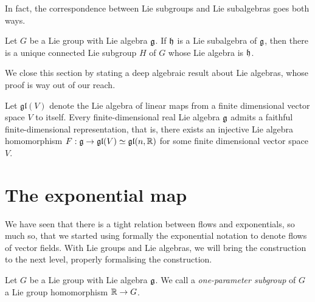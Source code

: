 In fact, the correspondence between Lie subgroups and Lie subalgebras goes both ways.

\begin{theorem}
	Let $G$ be a Lie group with Lie algebra $\mathfrak{g}$. If $\mathfrak{h}$ is a Lie subalgebra of $\mathfrak{g}$, then there is a unique connected Lie subgroup $H$ of $G$ whose Lie algebra is $\mathfrak{h}$.
\end{theorem}

We close this section by stating a deep algebraic result about Lie algebras, whose proof is way out of our reach.
\begin{theorem}
	Let $\mathfrak{gl}(V)$ denote the Lie algebra of linear maps from a finite dimensional vector space $V$ to itself.
	Every finite-dimensional real Lie algebra $\mathfrak{g}$ admits a faithful finite-dimensional representation, that is, there exists an injective Lie algebra homomorphism $F: \mathfrak{g} \to \mathfrak{gl}(V)\simeq\mathfrak{gl}(n,\mathbb{R})$ for some finite dimensional vector space $V$.
\end{theorem}

\section{The exponential map}

We have seen that there is a tight relation between flows and exponentials, so much so, that we started using formally the exponential notation to denote flows of vector fields.
With Lie groups and Lie algebras, we will bring the construction to the next level, properly formalising the construction.

\begin{definition}
	Let $G$ be a Lie group with Lie algebra $\mathfrak{g}$.
	We call a \emph{one-parameter subgroup} of $G$ a Lie group homomorphism $\mathbb{R}\to G$.
\end{definition}

